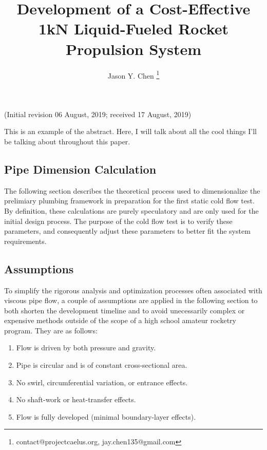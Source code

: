 \documentclass[10pt]{article} %
\title{Development of a Cost-Effective 1kN Liquid-Fueled Rocket Propulsion System}
\author[1]{Jason Y. Chen \footnote{contact@projectcaelus.org,  jay.chen135@gmail.com}}
\affil[1]{Founder, Project Caelus 501(c)(3)}
\date{} %
\numberwithin{equation}{section} %
\begin{document}
\maketitle
\vspace{-1cm}
\begin{center}
(Initial revision 06 August, 2019; received 17 August, 2019)
\end{center}
This is an example of the abstract. Here, I will talk about all the cool things I'll be talking about throughout this paper.
\begin{multicols}{2}
\section{Pipe Dimension Calculation}

The following section describes the theoretical process used to dimensionalize the prelimiary plumbing framework in preparation for the first static cold flow test. By definition, these calculations are purely speculatory and are only used for the initial design process. The purpose of the cold flow test is to verify these parameters, and consequently adjust these parameters to better fit the system requirements.

\subsection{Assumptions} \label{sec:assumptions}

To simplify the rigorous analysis and optimization processes often associated with viscous pipe flow, a couple of assumptions are applied in the following section to both shorten the development timeline and to avoid unecessarily complex or expensive methods outside of the scope of a high school amateur rocketry program. They are as follows:
\begin{enumerate}
\item Flow is driven by both pressure and gravity.
\item Pipe is circular and is of constant cross-sectional area. \label{itm:constant-area}
\item No swirl, circumferential variation, or entrance effects.
\item No shaft-work or heat-transfer effects. \label{itm:heat-effects}
\item Flow is fully developed (minimal boundary-layer effects).


\end{enumerate}
\end{multicols}
\end{document}
